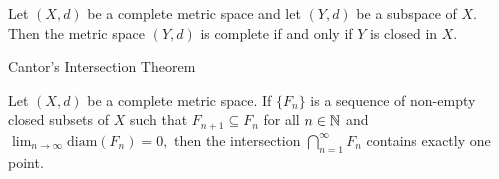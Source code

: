 \documentclass[12pt, a4paper]{article}
\begin{document}
\begin{theorem}
    Let $(X, d)$ be a complete metric space and let $(Y, d)$ be a subspace of $X.$ Then the metric space $(Y, d)$ is complete if and only if $Y$ is closed in $X.$
\end{theorem}


\clearpage

\begin{heading}
    Cantor's Intersection Theorem
\end{heading}

\vspace{10pt}

\begin{theorem}
    Let $(X, d)$ be a complete metric space. If $\{F_n\}$ is a sequence of non-empty closed subsets of $X$ such that $F_{n+1} \subseteq F_n$ for all $n \in \mathbb{N}$ and $\lim_{n \to \infty} \text{diam}(F_n) = 0,$ then the intersection $\bigcap_{n=1}^{\infty} F_n$ contains exactly one point.
\end{theorem}







\clearpage

\EndPage
\end{document}
